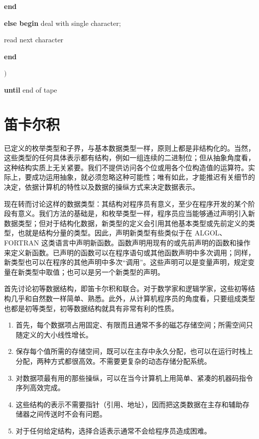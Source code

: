 \quad\quad \textbf{end}

\quad \textbf{else begin} deal with single character;

\quad\quad read next character

\quad \textbf{end}

\quad $)$

\textbf{until} end of tape
\section[笛卡尔积]{笛卡尔积}

已定义的枚举类型和子界，与基本数据类型一样，原则上都是非结构化的。当然，这些类型的任何具体表示都有结构，例如一组连续的二进制位；但从抽象角度看，这种结构实质上无关紧要。我们不提供访问各个位或用各个位构造值的运算符。实际上，要成功运用抽象，就必须忽略这种可能性；唯有如此，才能推迟有关细节的决定，依据计算机的特性以及数据的操纵方式来决定数据表示。

现在转而讨论这样的数据类型：其结构对程序员有意义，至少在程序开发的某个阶段有意义。我们方法的基础是，和枚举类型一样，程序员应当能够通过声明引入新数据类型；但对于结构化数据，新类型的定义会引用其他基本类型或先前定义的类型，也就是结构分量的类型。因此，声明新类型有些类似于在 ALGOL、FORTRAN 这类语言中声明新函数。函数声明用现有的或先前声明的函数和操作来定义新函数。已声明的函数可以在程序语句或其他函数声明中多次调用；同样，新类型也可以在程序的其他声明中多次“调用”。这些声明可以是变量声明，规定变量在新类型中取值；也可以是另一个新类型的声明。

首先讨论初等数据结构，即笛卡尔积和联合。对于数学家和逻辑学家，这些初等结构几乎和自然数一样简单、熟悉。此外，从计算机程序员的角度看，只要组成类型也都是初等类型，初等数据结构就具有非常有利的性质。

\begin{enumerate}[wide, nosep, label=(\arabic*)]
	\item 首先，每个数据项占用固定、有限而且通常不多的磁芯存储空间；所需空间只随定义的大小线性增长。

	\item 保存每个值所需的存储空间，既可以在主存中永久分配，也可以在运行时栈上分配，两种方式都很高效。不需要更复杂的动态存储分配系统。

	\item 对数据项最有用的那些操纵，可以在当今计算机上用简单、紧凑的机器码指令序列高效完成。

	\item 这些结构的表示不需要指针（引用、地址），因而把这类数据在主存和辅助存储器之间传送时不会有问题。

	\item 对于任何给定结构，选择合适表示通常不会给程序员造成困难。
\end{enumerate}

